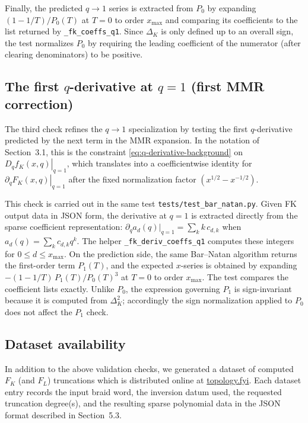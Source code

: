 \documentclass[twocolumn]{article}
\begin{document}
Finally, the predicted $q\to 1$ series is extracted from $P_0$ by expanding
\((1-1/T)/P_0(T)\) at $T=0$ to order $x_{\max}$ and comparing its coefficients
to the list returned by \texttt{\_fk\_coeffs\_q1}.
Since \(\Delta_K\) is only defined up to an overall sign, the test normalizes
$P_0$ by requiring the leading coefficient of the numerator (after clearing
denominators) to be positive.

\subsection{The first $q$-derivative at $q=1$ (first MMR correction)}

The third check refines the $q\to 1$ specialization by testing the first
$q$-derivative predicted by the next term in the MMR expansion.
In the notation of Section~3.1, this is the constraint
\eqref{eq:q-derivative-background} on
\(\left.D_q f_K(x,q)\right|_{q=1}\), which translates into a coefficientwise
identity for \(\left.\partial_q F_K(x,q)\right|_{q=1}\) after the fixed
normalization factor \((x^{1/2}-x^{-1/2})\).

This check is carried out in the same test
\texttt{tests/test\_bar\_natan.py}.
Given FK output data in JSON form, the derivative at $q=1$ is extracted directly
from the sparse coefficient representation:
\(\partial_q a_d(q)|_{q=1}=\sum_k k\,c_{d,k}\) when
\(a_d(q)=\sum_k c_{d,k}q^k\).
The helper \texttt{\_fk\_deriv\_coeffs\_q1} computes these integers for
$0\le d\le x_{\max}$.
On the prediction side, the same Bar--Natan algorithm returns the first-order
term $P_1(T)$, and the expected $x$-series is obtained by expanding
\(-(1-1/T)\,P_1(T)/P_0(T)^3\) at $T=0$ to order $x_{\max}$.
The test compares the coefficient lists exactly.
Unlike $P_0$, the expression governing $P_1$ is sign-invariant because it is
computed from $\Delta_K^2$; accordingly the sign normalization applied to $P_0$
does not affect the $P_1$ check.

\subsection{Dataset availability}

In addition to the above validation checks, we generated a dataset of computed
$F_K$ (and $F_L$) truncations which is distributed online at
\url{topology.fyi}.
Each dataset entry records the input braid word, the inversion datum used,
the requested truncation degree(s), and the resulting sparse polynomial data in
the JSON format described in Section~5.3.
\end{document}

